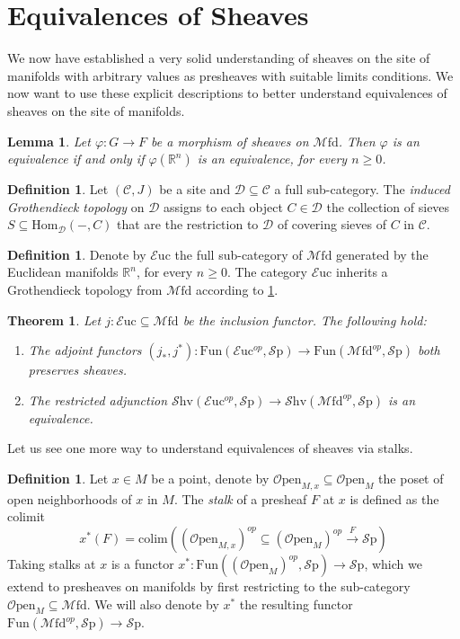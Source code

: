 \documentclass[10pt]{amsart}
\newcommand{\C}{\mathscr{C}}
\newcommand{\D}{\mathscr{D}}
\newcommand{\bR}{\mathbb{R}}
\newcommand{\Hom}{\mathrm{Hom}}
\newcommand{\Sp}{\mathscr{S}\mathrm{p}}
\newcommand{\Fun}{\mathrm{Fun}}
\newcommand{\colim}{\mathrm{colim}}
\newcommand{\Euc}{\mathscr{E}\mathrm{uc}}
\newcommand{\Mfd}{\mathscr{M}\mathrm{fd}}
\newcommand{\Shv}{\mathscr{S}\mathrm{hv}}
\newcommand{\Open}{\mathscr{O}\mathrm{pen}}
\newtheorem{theorem}[equation]{Theorem}
\newtheorem{lemma}[equation]{Lemma}
\theoremstyle{definition}
\newtheorem{definition}[equation]{Definition}
\theoremstyle{remark}
\numberwithin{equation}{section}
\begin{document}
\section{Equivalences of Sheaves}

We now have established a very solid understanding of sheaves on the site of manifolds with arbitrary values as presheaves with suitable limits conditions. We now want to use these explicit descriptions to better understand equivalences of sheaves on the site of manifolds.

\begin{lemma}
 Let $\varphi\colon G\to F$ be a morphism of sheaves on $\Mfd$. Then $\varphi$ is an equivalence if and only if $\varphi(\bR^n)$ is an equivalence, for every $n\geq0$.
\end{lemma}
\begin{definition}\label{def:indtop}
	Let $(\C,J)$ be a site and $\D\subseteq\C$ a full sub-category. The \emph{induced Grothendieck topology} on $\D$ assigns to each object $C\in\D$ the collection of sieves $S\subseteq\Hom_{\D}(-,C)$ that are the restriction to $\D$ of covering sieves of $C$ in $\C$.
\end{definition}
\begin{definition}
	Denote by $\Euc$ the full sub-category of $\Mfd$ generated by the Euclidean manifolds $\bR^n$, for every $n\geq0$. The category $\Euc$ inherits a Grothendieck topology from $\Mfd$ according to \cref{def:indtop}.
\end{definition}
\begin{theorem}
Let $j:\Euc\subseteq\Mfd$ be the inclusion functor. The following hold:
\begin{enumerate}
  \item The adjoint functors $(j_*,j^*):\Fun(\Euc^{op},\Sp)\rightarrow\Fun(\Mfd^{op},\Sp)$ both preserves sheaves.
  \item The restricted adjunction $\Shv(\Euc^{op},\Sp)\rightarrow\Shv(\Mfd^{op},\Sp)$ is an equivalence.
\end{enumerate}
\end{theorem}

Let us see one more way to understand equivalences of sheaves via stalks.

\begin{definition}
  Let $x \in M$ be a point, denote by $\Open_{M,x}\subseteq\Open_M$ the poset of open neighborhoods of $x$ in $M$. The \emph{stalk} of a presheaf $F$ at $x$ is defined as the  colimit 
  \[x^*(F) = \colim((\Open_{M,x})^{op}\subseteq(\Open_M)^{op}\xrightarrow{F}\Sp)\]
  Taking stalks at $x$ is a functor $x^*:\Fun((\Open_M)^{op},\Sp)\to\Sp$, which we extend to presheaves on manifolds by first restricting to the sub-category $\Open_M\subseteq\Mfd$. We will also denote by $x^*$ the resulting functor $\Fun(\Mfd^{op},\Sp)\to\Sp$.
\end{definition}
\end{document}
